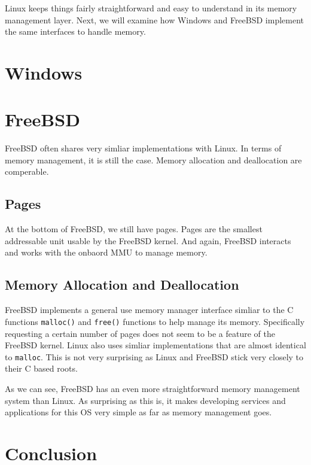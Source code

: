 \documentclass[10pt,letterpaper,onecolumn,draftclsnofoot]{IEEEtran}
\begin{document}
	Linux keeps things fairly straightforward and easy to understand in its
	memory management layer. Next, we will examine how Windows and FreeBSD
	implement the same interfaces to handle	memory.
  \section{Windows}
  \subsection{}
  \subsection{}
  \section{FreeBSD}
  FreeBSD often shares very simliar implementations with Linux. In terms of memory
  management, it is still the case. Memory allocation and deallocation are comperable. 
  \subsection{Pages}
  At the bottom of FreeBSD, we still have pages. Pages are the smallest addressable
  unit usable by the FreeBSD kernel. And again, FreeBSD interacts and works with the 
  onbaord MMU to manage memory. 
  \subsection{Memory Allocation and Deallocation}
  FreeBSD implements a general use memory manager interface simliar to the C 
  functions \texttt{malloc()} and 
  \texttt{free()} functions to help manage its memory. Specifically requesting 
  a certain number of pages does not seem to be a feature of the FreeBSD kernel.
  Linux also uses simliar implementations that are almost identical to \texttt{malloc}.
  This is not very surprising as Linux and FreeBSD stick very closely to their C
  based roots. \cite{freebsd2016}
 
  As we can see, FreeBSD has an even more straightforward memory management system
  than Linux. As surprising as this is, it makes developing services and applications
  for this OS very simple as far as memory management goes.
  \section{Conclusion}
\end{document}
